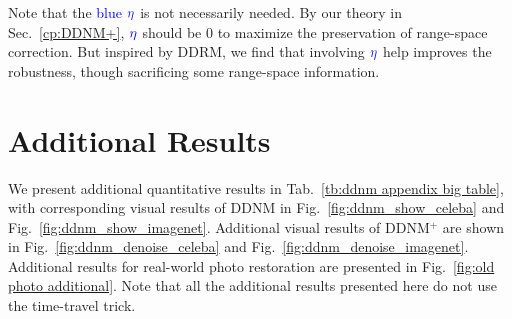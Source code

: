 \documentclass{article} \usepackage{iclr2023_conference,times}
\begin{document}
Note that the \textcolor{blue}{blue} $\textcolor{blue}{\eta}$ is not necessarily needed. By our theory in Sec.~\ref{cp:DDNM+}, $\textcolor{blue}{\eta}$ should be 0 to maximize the preservation of range-space correction. But inspired by DDRM\citep{kawar2022denoising}, we find that involving $\textcolor{blue}{\eta}$ help improves the robustness, though sacrificing some range-space information.   


\newpage
\section{Additional Results}
\label{extensive exp ndm}
We present additional quantitative results in Tab.~\ref{tb:ddnm appendix big table}, with corresponding visual results of DDNM in Fig.~\ref{fig:ddnm_show_celeba} and Fig.~\ref{fig:ddnm_show_imagenet}. Additional visual results of DDNM$^+$ are shown in Fig.~\ref{fig:ddnm_denoise_celeba} and Fig.~\ref{fig:ddnm_denoise_imagenet}. Additional results for real-world photo restoration are presented in Fig.~\ref{fig:old photo additional}. Note that all the additional results presented here do not use the time-travel trick.
\end{document}
